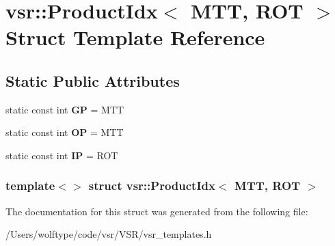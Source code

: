 \hypertarget{structvsr_1_1_product_idx_3_01_m_t_t_00_01_r_o_t_01_4}{\section{vsr\-:\-:Product\-Idx$<$ M\-T\-T, R\-O\-T $>$ Struct Template Reference}
\label{structvsr_1_1_product_idx_3_01_m_t_t_00_01_r_o_t_01_4}
}
\subsection*{Static Public Attributes}
\begin{DoxyCompactItemize}
\item 
\hypertarget{structvsr_1_1_product_idx_3_01_m_t_t_00_01_r_o_t_01_4_ac9d8c68942d426c9e23cae77ca4cd061}{static const int {\bfseries G\-P} = M\-T\-T}\label{structvsr_1_1_product_idx_3_01_m_t_t_00_01_r_o_t_01_4_ac9d8c68942d426c9e23cae77ca4cd061}

\item 
\hypertarget{structvsr_1_1_product_idx_3_01_m_t_t_00_01_r_o_t_01_4_a22f4e508668f14664aa6d5df7133d5fc}{static const int {\bfseries O\-P} = M\-T\-T}\label{structvsr_1_1_product_idx_3_01_m_t_t_00_01_r_o_t_01_4_a22f4e508668f14664aa6d5df7133d5fc}

\item 
\hypertarget{structvsr_1_1_product_idx_3_01_m_t_t_00_01_r_o_t_01_4_a446b2f3082f414da392578f77d0da01f}{static const int {\bfseries I\-P} = R\-O\-T}\label{structvsr_1_1_product_idx_3_01_m_t_t_00_01_r_o_t_01_4_a446b2f3082f414da392578f77d0da01f}

\end{DoxyCompactItemize}
\subsubsection*{template$<$$>$ struct vsr\-::\-Product\-Idx$<$ M\-T\-T, R\-O\-T $>$}



The documentation for this struct was generated from the following file\-:\begin{DoxyCompactItemize}
\item 
/\-Users/wolftype/code/vsr/\-V\-S\-R/vsr\-\_\-templates.\-h\end{DoxyCompactItemize}
